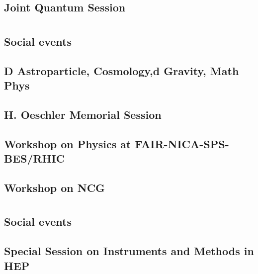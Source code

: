 \subsection{Joint Quantum Session}

\clearpage

\section{}
\subsection{Social events}

\clearpage

\subsection{D Astroparticle, Cosmology,d Gravity, Math Phys}

\clearpage

\subsection{H. Oeschler Memorial Session}

\clearpage

\subsection{Workshop on Physics at FAIR-NICA-SPS-BES/RHIC}

\clearpage

\subsection{Workshop on NCG}

\clearpage

\section{}
\subsection{Social events}

\clearpage

\subsection{Special Session on Instruments and Methods in HEP}

\clearpage

